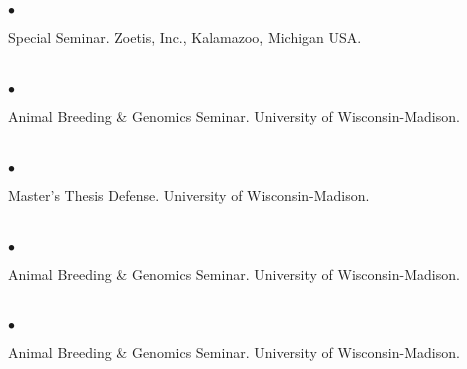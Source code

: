 \documentclass[margin,line,10pt]{res}
\newenvironment{list2}{
  \begin{list}{$\bullet$}{%
      \setlength{\itemsep}{0in}
      \setlength{\parsep}{0in} \setlength{\parskip}{0in}
      \setlength{\topsep}{0in} \setlength{\partopsep}{0in} 
      \setlength{\leftmargin}{0.2in}}}{\end{list}}
\begin{document}
\begin{resume}
\section{}
\begin{list2}
\item  Special Seminar.  Zoetis, Inc., Kalamazoo, Michigan USA.
\end{list2}  
\section{}
\begin{list2}
 \item Animal Breeding \& Genomics Seminar.  University of Wisconsin-Madison. 
\end{list2}  
\section{}
\begin{list2}
\item  Master's Thesis Defense.  University of Wisconsin-Madison.
\end{list2}  
\section{}
\begin{list2}
\item Animal Breeding \& Genomics Seminar.  University of Wisconsin-Madison.
\end{list2}
\section{}
\begin{list2}
\item  Animal Breeding \& Genomics Seminar.   University of Wisconsin-Madison.
\end{list2}







\end{resume}
\end{document}
